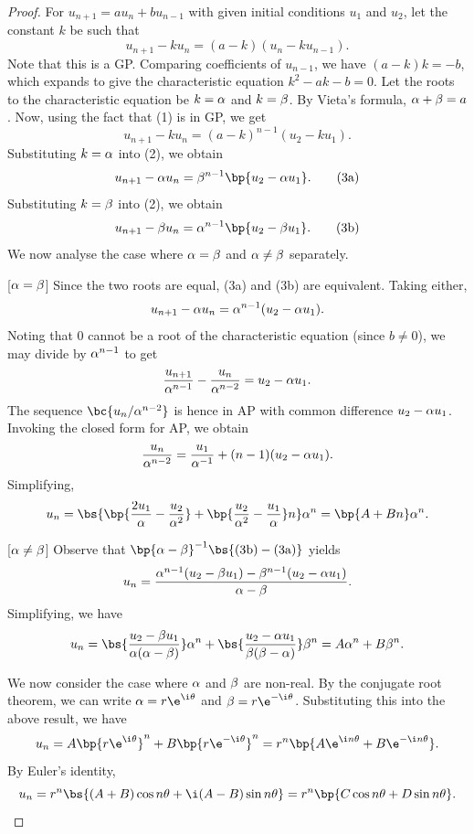 \begin{proof}
    For $u_{n+1} = a u_n + b u_{n-1}$ with given initial conditions $u_1$ and $u_2$, let the constant $k$ be such that \[u_{n+1} - k u_n = (a-k) (u_n - ku_{n-1}). \tag{1}\] Note that this is a GP. Comparing coefficients of $u_{n-1}$, we have $(a-k)k = -b$, which expands to give the characteristic equation $k^2 - ak - b = 0$. Let the roots to the characteristic equation be $k = \alpha$ and $k = \beta$. By Vieta's formula, $\alpha + \beta = a$. Now, using the fact that (1) is in GP, we get \[u_{n+1} - ku_n = (a-k)^{n-1} (u_2 - ku_1). \tag{2}\] Substituting $k = \alpha$ into (2), we obtain \[u_{n+1} - \a u_n = \b^{n-1} \bp{u_2 - \a u_1}. \tag{3a}\] Substituting $k = \beta$ into (2), we obtain \[u_{n+1} - \b u_n = \a^{n-1} \bp{u_2 - \b u_1}. \tag{3b}\] We now analyse the case where $\alpha = \beta$ and $\alpha \neq \beta$ separately.

    [$\alpha = \beta$] Since the two roots are equal, (3a) and (3b) are equivalent. Taking either, \[u_{n+1} - \alpha u_n = \alpha^{n-1} (u_2 - \alpha u_1).\] Noting that 0 cannot be a root of the characteristic equation (since $b \neq 0$), we may divide by $\alpha^{n-1}$ to get \[\frac{u_{n+1}}{\alpha^{n-1}} - \frac{u_n}{\alpha^{n-2}} = u_2 - \alpha u_1.\] The sequence $\bc{u_n/\a^{n-2}}$ is hence in AP with common difference $u_2 - \alpha u_1$. Invoking the closed form for AP, we obtain \[\frac{u_n}{\alpha^{n-2}} = \frac{u_1}{\alpha^{-1}} + (n-1)(u_2 - \alpha u_1).\] Simplifying, \[u_n = \bs{\bp{\frac{2u_1}{\a} - \frac{u_2}{\a^2}} + \bp{\frac{u_2}{\a^2} - \frac{u_1}{\a}}n} \a^n = \bp{A + Bn} \a^n.\]

    [$\alpha \neq \beta$] Observe that $\bp{\a - \b}^{-1} \bs{\text{(3b)} - \text{(3a)}}$ yields \[u_n = \frac{\alpha^{n-1} (u_2 - \beta u_1) - \beta^{n-1} (u_2 - \alpha u_1)}{\alpha - \beta}.\] Simplifying, we have \[u_n = \bs{\frac{u_2 - \b u_1}{\a (\a - \b)}} \a^n + \bs{\frac{u_2 - \a u_1}{\b (\b - \a)}} \b^n = A\a^n + B\b^n.\]

    We now consider the case where $\alpha$ and $\beta$ are non-real. By the conjugate root theorem, we can write $\a = r\e^{\i \t}$ and $\b = r \e^{-\i \t}$. Substituting this into the above result, we have \[u_n = A\bp{r\e^{\i \t}}^n + B\bp{r\e^{-\i \t}}^n = r^n \bp{A \e^{\i n \t} + B \e^{-\i n \t}}.\] By Euler's identity, \[u_n = r^n \bs{(A+B) \cos n\t + \i (A-B) \sin n\t} = r^n \bp{C \cos n\t + D \sin n\t}.\]
\end{proof}
